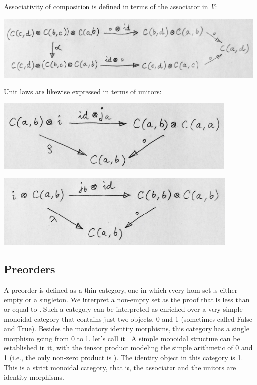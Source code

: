 Associativity of composition is defined in terms of the associator in
\emph{V}:

\includegraphics[width=5.35417in]{images/compcoherence.jpg}

Unit laws are likewise expressed in terms of unitors:

\includegraphics[width=4.64583in]{images/rightid.jpg}

\includegraphics[width=4.65625in]{images/leftid.jpg}

\subsection{Preorders}\label{preorders}

A preorder is defined as a thin category, one in which every hom-set is
either empty or a singleton. We interpret a non-empty set
 as the proof that  is less than or equal to
. Such a category can be interpreted as enriched over a very
simple monoidal category that contains just two objects, 0 and 1
(sometimes called False and True). Besides the mandatory identity
morphisms, this category has a single morphism going from 0 to 1, let's
call it . A simple monoidal structure can be
established in it, with the tensor product modeling the simple
arithmetic of 0 and 1 (i.e., the only non-zero product is ).
The identity object in this category is 1. This is a strict monoidal
category, that is, the associator and the unitors are identity
morphisms.

